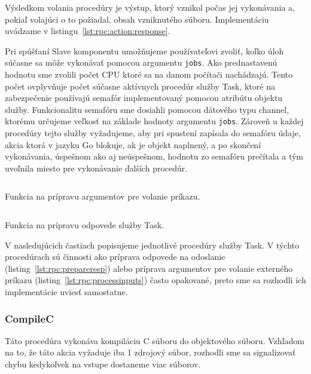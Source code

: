 Výsledkom volania procedúry je výstup, ktorý vznikol počas jej vykonávania a,
pokiaľ volajúci o to požiadal, obsah vzniknutého súboru. Implementáciu uvádzame
v listingu~\ref{lst:rpc:action:response}.

Pri spúšťaní Slave komponentu umožňujeme používateľovi zvoliť, koľko úloh súčasne sa
môže vykonávať pomocou argumentu \texttt{jobs}. Ako prednastavenú hodnotu sme zvolili počet
CPU ktoré sa na danom počítači nachádzajú. Tento počet ovplyvňuje počet súčasne
aktívnych procedúr služby Task, ktoré na zabezpečenie používajú semafór implementovaný
pomocou atribútu objektu služby. Funkcionalitu semafóru sme dosiahli pomocou
dátového typu channel, ktorému určujeme veľkosť na základe hodnoty argumentu \texttt{jobs}.
Zároveň u každej procedúry tejto služby vyžadujeme, aby pri spustení zapísala do semafóru
údaje, akcia ktorá v jazyku Go blokuje, ak je objekt naplnený, a po skončení vykonávania,
úspešnom ako aj neúspešnom, hodnotu zo semafóru prečítala a tým uvoľnila miesto pre
vykonávanie ďalších procedúr.

\begin{listing}[H]
  \inputminted[frame=lines,framesep=2mm,linenos,fontsize=\scriptsize,firstline=9,lastline=22]{go}{/home/pepol/src/imterra/forge/worker/tasks/util.go}
  \caption{Funkcia na prípravu argumentov pre volanie príkazu.}
  \label{lst:rpc:processinputs}
\end{listing}

\begin{listing}[H]
  \inputminted[frame=lines,framesep=2mm,linenos,fontsize=\scriptsize,firstline=24,lastline=40]{go}{/home/pepol/src/imterra/forge/worker/tasks/util.go}
  \caption{Funkcia na prípravu odpovede služby Task.}
  \label{lst:rpc:prepareresp}
\end{listing}

V nasledujúcich častiach popisujeme jednotlivé procedúry služby Task. V týchto
procedúrach sú činnosti ako príprava odpovede na odoslanie (listing~\ref{lst:rpc:prepareresp})
alebo príprava argumentov pre volanie externého príkazu (listing~\ref{lst:rpc:processinputs})
často opakované, preto sme sa rozhodli ich implementácie uviesť samostatne.

\subsubsection{CompileC}

Táto procedúra vykonáva kompiláciu C súboru do objektového súboru. Vzhľadom na to,
že táto akcia vyžaduje iba 1 zdrojový súbor, rozhodli sme sa signalizovať chybu
kedykoľvek na vstupe dostaneme viac súborov.

